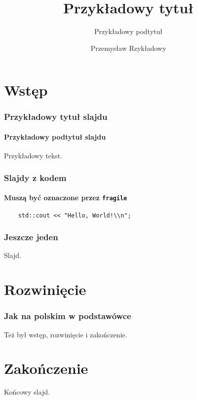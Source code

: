 \documentclass[aspectratio=169]{beamer}
\title{Przykładowy tytuł}
\subtitle{Przykładowy podtytuł}
\author{Przemysław Rzykładowy}
\institute{Polsko-Japońska Akademia Technik Komputerowych}
\begin{document}
{%
    \frame{\titlepage}
}

\section{Wstęp}

\begin{frame}
    \frametitle{Przykładowy tytuł slajdu}
    \framesubtitle{Przykładowy podtytuł slajdu}

    Przykładowy tekst.
\end{frame}

\begin{frame}[fragile]
    \frametitle{Slajdy z kodem}
    \framesubtitle{Muszą być oznaczone przez \texttt{fragile}}

    \begin{lstlisting}
    std::cout << "Hello, World!\\n";
    \end{lstlisting}
\end{frame}

\begin{frame}
    \frametitle{Jeszcze jeden}

    Slajd.
\end{frame}

\section{Rozwinięcie}

\begin{frame}
    \frametitle{Jak na polskim w podstawówce}

    Też był wstęp, rozwinięcie i zakończenie.
\end{frame}

\section{Zakończenie}

\begin{frame}
    Końcowy slajd.
\end{frame}
\end{document}
